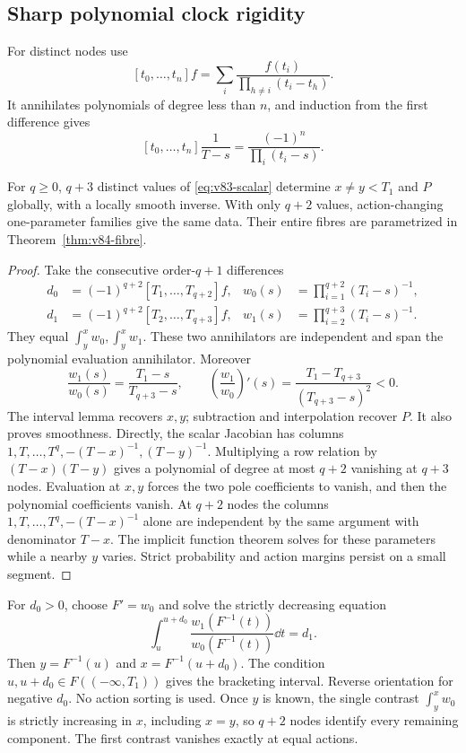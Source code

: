 \subsection{Sharp polynomial clock rigidity}
For distinct nodes use
\[
 [t_0,\ldots,t_n]f=\sum_i\frac{f(t_i)}{\prod_{h\ne i}(t_i-t_h)}.
\]
It annihilates polynomials of degree less than $n$, and induction from
the first difference gives
\begin{equation}\label{eq:v83-cauchy-dd}
 [t_0,\ldots,t_n]\frac1{T-s}=\frac{(-1)^n}{\prod_i(t_i-s)}.
\end{equation}
\begin{theorem}\label{thm:v83-scalar}
For $q\ge0$, $q+3$ distinct values of \eqref{eq:v83-scalar} determine
$x\ne y<T_1$ and $P$ globally, with a locally smooth inverse. With
only $q+2$ values, action-changing one-parameter families give the same
data. Their entire fibres are parametrized in
Theorem~\ref{thm:v84-fibre}.
\end{theorem}
\begin{proof}
Take the consecutive order-$q+1$ differences
\begin{align}
 d_0&=(-1)^{q+2}[T_1,\ldots,T_{q+2}]f,
 &w_0(s)&=\prod_{i=1}^{q+2}(T_i-s)^{-1},\label{eq:v83-contrasts}\\
 d_1&=(-1)^{q+2}[T_2,\ldots,T_{q+3}]f,
 &w_1(s)&=\prod_{i=2}^{q+3}(T_i-s)^{-1}.\nonumber
\end{align}
They equal $\int_y^xw_0,\int_y^xw_1$. These two annihilators are
independent and span the polynomial evaluation annihilator. Moreover
\begin{equation}\label{eq:v83-ratio}
 \frac{w_1(s)}{w_0(s)}=\frac{T_1-s}{T_{q+3}-s},\qquad
 \left(\frac{w_1}{w_0}\right)'(s)
 =\frac{T_1-T_{q+3}}{(T_{q+3}-s)^2}<0.
\end{equation}
The interval lemma recovers $x,y$; subtraction and interpolation recover
$P$. It also proves smoothness. Directly, the scalar Jacobian has
columns $1,T,\ldots,T^q,-(T-x)^{-1},(T-y)^{-1}$. Multiplying a row
relation by $(T-x)(T-y)$ gives a polynomial of degree at most $q+2$
vanishing at $q+3$ nodes. Evaluation at $x,y$ forces the two pole
coefficients to vanish, and then the polynomial coefficients vanish.
At $q+2$ nodes the columns $1,T,\ldots,T^q,-(T-x)^{-1}$ alone are
independent by the same argument with denominator $T-x$. The implicit
function theorem solves for these parameters while a nearby $y$ varies.
Strict probability and action margins persist on a small segment.
\end{proof}
For $d_0>0$, choose $F'=w_0$ and solve the strictly decreasing equation
\begin{equation}\label{eq:v83-monotone-solve}
 \int_u^{u+d_0}\frac{w_1(F^{-1}(t))}{w_0(F^{-1}(t))}\dd t=d_1.
\end{equation}
Then $y=F^{-1}(u)$ and $x=F^{-1}(u+d_0)$. The condition
$u,u+d_0\in F((-\infty,T_1))$ gives the bracketing interval. Reverse
orientation for negative $d_0$. No action sorting is used. Once $y$ is
known, the single contrast $\int_y^xw_0$ is strictly increasing in $x$,
including $x=y$, so $q+2$ nodes identify every remaining component.
The first contrast vanishes exactly at equal actions.
